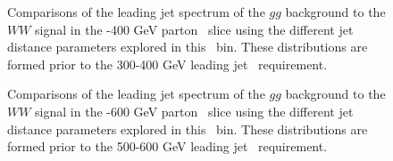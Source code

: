\begin{figure}
\begin{center}
\caption{Comparisons of the leading jet \pt spectrum of the $gg$
  background to the $WW$ signal in the -400 GeV parton \pt~slice using the
  different \antikt jet distance parameters explored in this \pt~bin. These
  distributions are formed prior to the 300-400 GeV leading jet \pt~requirement.}
\label{fig:pt300_basics}
\end{center}
\end{figure}

\begin{figure}
\begin{center}
\caption{Comparisons of the leading jet \pt spectrum of the $gg$
  background to the $WW$ signal in the -600 GeV parton \pt~slice using the
  different \antikt jet distance parameters explored in this \pt~bin. These
  distributions are formed prior to the 500-600 GeV leading jet \pt~requirement.} 
\label{fig:pt500_basics}
\end{center}
\end{figure}

